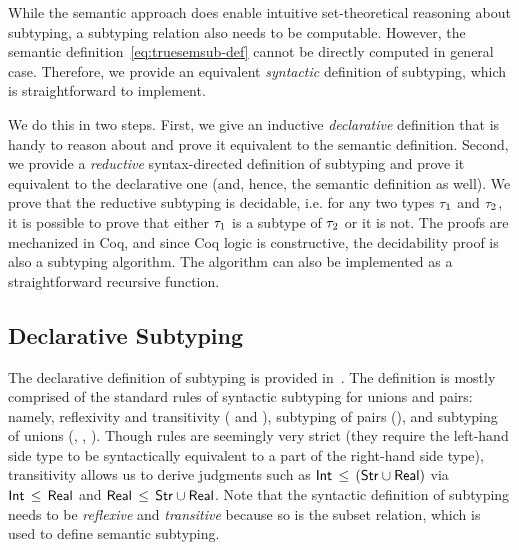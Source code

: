 While the semantic approach does enable intuitive set-theo\-re\-tical 
reasoning about subtyping,
a subtyping relation also needs to be computable.
However, the semantic definition~\eqref{eq:truesemsub-def}
cannot be directly computed in general case.
Therefore, we provide an equivalent 
\emph{syntactic} definition of subtyping, which is straightforward to implement.

We do this in two steps. 
First, we give an inductive \emph{declarative} definition
that is handy to reason about 
and prove it equivalent to the semantic definition.
Second, we provide a \emph{reductive} syntax-directed definition of subtyping
and prove it equivalent to the declarative one 
(and, hence, the semantic definition as well).
We prove that the reductive subtyping is decidable, 
i.e. for any two types $\tau_1$ and $\tau_2$,
it is possible to prove that either $\tau_1$ is a subtype of $\tau_2$ 
or it is not.
The proofs are mechanized in Coq, and since Coq logic is constructive,
the decidability proof is also a subtyping algorithm.
The algorithm can also be implemented as a straightforward recursive function.

\subsection{Declarative Subtyping}\label{sec:declsub}

The declarative definition of subtyping is provided in~.
The definition is mostly comprised of the standard rules
of syntactic subtyping for unions and pairs:
namely, reflexivity and transitivity ( and ), 
subtyping of pairs (),
and subtyping of unions (, , ).
Though  rules are seemingly very strict 
(they require the left-hand side type to be syntactically equivalent
to a part of the right-hand side type), 
transitivity allows us to derive judgments such as
$\mathsf{Int} \, \leq \, (\mathsf{Str} \cup \mathsf{Real})$ via
$\mathsf{Int} \, \leq \, \mathsf{Real}$ and $\mathsf{Real} \, \leq \, \mathsf{Str} \cup \mathsf{Real}$.
Note that the syntactic definition of subtyping needs
to be \emph{reflexive} and \emph{transitive} because so is the subset relation,
which is used to define semantic subtyping.

